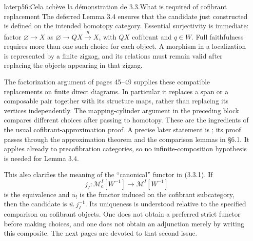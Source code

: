 \begin{dcomment}{later}{p56:Cela achève la démonstration de 3.3.}{What is required of cofibrant replacement}
The deferred Lemma 3.4 ensures that the candidate just constructed is defined on the intended homotopy category. Essential surjectivity is immediate: factor $\varnothing\to X$ as $\varnothing\to QX\xrightarrow{q}X$, with $QX$ cofibrant and $q\in W$. Full faithfulness requires more than one such choice for each object. A morphism in a localization is represented by a finite zigzag, and its relations must remain valid after replacing the objects appearing in that zigzag.

The factorization argument of pages 45--49 supplies these compatible replacements on finite direct diagrams. In particular it replaces a span or a composable pair together with its structure maps, rather than replacing its vertices independently. The mapping-cylinder argument in the preceding block compares different choices after passing to homotopy. These are the ingredients of the usual cofibrant-approximation proof. A precise later statement is \citet[Theorem 6.1.6(1)]{RadulescuBanu2009}; its proof passes through the approximation theorem and the comparison lemmas in \S6.1. It applies already to precofibration categories, so no infinite-composition hypothesis is needed for Lemma 3.4.

This also clarifies the meaning of the ``canonical'' functor in (3.3.1). If
\[
 j_I:\mathcal M^I_{\mathrm c}[W^{-1}]
          \longrightarrow\mathcal M^I[W^{-1}]
\]
is the equivalence and $\overline{u_!}$ is the functor induced on the cofibrant subcategory, then the candidate is $\overline{u_!}\,j_I^{-1}$. Its uniqueness is understood relative to the specified comparison on cofibrant objects. One does not obtain a preferred strict functor before making choices, and one does not obtain an adjunction merely by writing this composite. The next pages are devoted to that second issue.
\end{dcomment}

